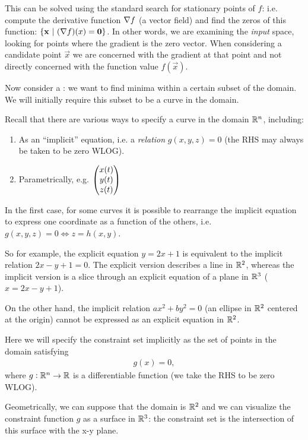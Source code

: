 This can be solved using the standard search for stationary points of $f$: i.e. compute the
derivative function $\nabla f$ (a vector field) and find the zeros of this function:
$\{\mathbf{x} ~|~ (\nabla f)(x) = \mathbf{0} \}$. In other words, we are examining the \emph{input } space, looking
for points where the gradient is the zero vector. When considering a candidate point $\vec{x}$
we are concerned with the gradient at that point and not directly concerned with the function value
$f(\vec{x})$.

Now consider a : we want to find minima within a certain
subset of the domain. We will initially require this subset to be a curve in the domain.

Recall that there are various ways to specify a curve in the domain $\mathbb{R}^n$, including:
\begin{enumerate}
\item As an ``implicit'' equation, i.e. a {\it relation} $g(x, y, z) = 0$ (the RHS may always be taken to be zero WLOG).
\item Parametrically, e.g. $\begin{pmatrix}x(t)\\y(t)\\z(t)\end{pmatrix}$
\end{enumerate}
In the first case, for some curves it is possible to rearrange the implicit equation to express one
coordinate as a function of the others, i.e. $g(x, y, z) = 0 \iff z = h(x, y)$.

So for example, the explicit equation $y = 2x + 1$ is equivalent to the implicit relation
$2x - y + 1 = 0$. The explicit version describes a line in $\mathbb{R}^2$, whereas the implicit
version is a slice through an explicit equation of a plane in $\mathbb{R}^3$ ($x = 2x - y + 1$).

On the other hand, the implicit relation $ax^2 + by^2 = 0$ (an ellipse in $\mathbb{R}^2$ centered at
the origin) cannot be expressed as an explicit equation in $\mathbb{R}^2$.

Here we will specify the constraint set implicitly as the set of points in the domain satisfying
\begin{align*}
  g(x) = 0,
\end{align*}
where $g:\mathbb{R}^n \to \mathbb{R}$ is a differentiable function (we take the RHS to be zero WLOG).

Geometrically, we can suppose that the domain is $\mathbb{R}^2$ and we can visualize the constraint function $g$ as a
surface in $\mathbb{R}^3$: the constraint set is the intersection of this surface with the x-y plane.


